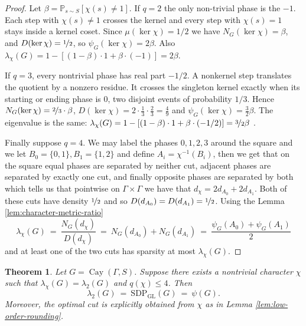 \documentclass[11pt]{article}
\newtheorem{theorem}{Theorem}[section]
\theoremstyle{definition}
\theoremstyle{remark}
\newcommand{\Prb}{\mathbb{P}}
\newcommand{\Cay}{\operatorname{Cay}}
\newcommand{\gl}{\operatorname{SDP_{GL}}}
\begin{document}
\begin{proof}
Let $\beta=\Prb_{s\sim S}[\chi(s)\neq 1]$. If $q=2$ the only non-trivial phase is the $-1$. Each step with $\chi(s)\neq 1$ crosses the kernel and every step with $\chi(s)=1$ stays inside a kernel coset. Since $\mu(\ker\chi)=1/2$ we have $N_G(\ker\chi)=\beta$,  and $D(\ker\chi)=\nicefrac{1}{2}$, so $\psi_G(\ker\chi)=2\beta$. Also $\lambda_\chi(G)=1-[(1-\beta)\cdot1+\beta\cdot(-1)]=2\beta$.

If $q=3$, every nontrivial phase has real part $-1/2$. A nonkernel step translates the quotient by a nonzero residue. It crosses the singleton kernel exactly when its starting or ending phase is $0$, two disjoint events of probability $1/3$. Hence $N_G(\ker\chi)=\nicefrac{2}{3} \cdot \beta$,  $  D(\ker\chi)=2\cdot\frac{1}{3}\cdot\frac{2}{3}=\frac{4}{9}$ and $\psi_G(\ker\chi)=\frac{3}{2}\beta$.  The eigenvalue is the same: $\lambda_\chi(G)
  =1-[(1-\beta)\cdot1+\beta\cdot(-1/2)]
  =\nicefrac{3}{2}\beta$ .

Finally suppose $q=4$. We may label the phases $0,1,2,3$ around the square and we let $B_0=\{0,1\},   B_1=\{1,2\}$ and define $A_i=\chi^{-1}(B_i)$, then we get that on the square equal phases are separated by neither cut, adjacent phases are separated by exactly one cut, and finally opposite phases are separated by both which tells us that pointwise on $\Gamma\times\Gamma$ we have that $d_\chi=2d_{A_0}+2d_{A_1}$. Both of these cuts have density $\nicefrac{1}{2}$ and so $D(d_{A_0})=D(d_{A_1})=\nicefrac{1}{2}$. Using the Lemma \ref{lem:character-metric-ratio}
\[
  \lambda_\chi(G)
  ~=~ \frac{N_G(d_\chi)}{D(d_\chi)}
  ~=~ N_G(d_{A_0})+N_G(d_{A_1})
  ~=~ \frac{\psi_G(A_0)+\psi_G(A_1)}{2}
\]
and at least one of the two cuts has sparsity at most $\lambda_\chi(G)$.
\end{proof}

\begin{theorem}\label{thm:low-order-bottom-character}
Let $G=\Cay(\Gamma,S)$. Suppose there exists a nontrivial character $\chi$ such that $\lambda_\chi(G)=\lambda_2(G)$ and $q(\chi)\leq 4$.
Then
\[
  \lambda_2(G) ~=~ \gl(G) ~=~ \psi(G).
\]
Moreover, the optimal cut is explicitly obtained from $\chi$ as in Lemma \ref{lem:low-order-rounding}.
\end{theorem}
\end{document}
